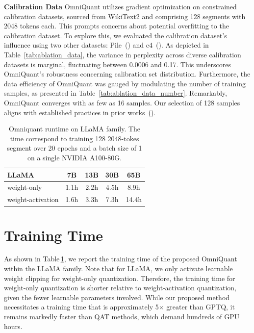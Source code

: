 \documentclass{article} %
\begin{document}
\textbf{Calibration Data}
OmniQuant utilizes gradient optimization on constrained calibration datasets, sourced from WikiText2 and comprising 128 segments with 2048 tokens each. This prompts concerns about potential overfitting to the calibration dataset. To explore this, we evaluated the calibration dataset's influence using two other datasets: Pile~(\cite{pile}) and c4~(\cite{c4}).
%
As depicted in Table~\ref{tab:ablation_data}, the variance in perplexity across diverse calibration datasets is marginal, fluctuating between 0.0006 and 0.17.  This underscores OmniQuant's robustness concerning calibration set distribution.
%
Furthermore, the data efficiency of OmniQuant was gauged by modulating the number of training samples, as presented in Table~\ref{tab:ablation_data_number}. Remarkably, OmniQuant converges with as few as 16 samples. Our selection of 128 samples aligns with established practices in prior works~(\cite{gptq,awq}).

\begin{table}[!ht]
    \centering
    \caption{Omniquant runtime on LLaMA family. The time correspond to training 128 2048-tokes segment over 20 epochs and a batch size of 1 on a single NVIDIA A100-80G.}
    \begin{tabular}{lcccc}
    \hline
    LLaMA & 7B & 13B & 30B & 65B \\
    \hline
    weight-only & 1.1h & 2.2h & 4.5h & 8.9h \\ 
    weight-activation & 1.6h & 3.3h & 7.3h & 14.4h\\
    \hline 
    \end{tabular}
    \label{tab:time}
\end{table}

\section{Training Time}\label{sec:training-time}
As shown in Table\,\ref{tab:time}, we report the training time of the proposed OmniQuant within the LLaMA family. Note that for LLaMA, we only activate learnable weight clipping for weight-only quantization. Therefore, the training time for weight-only quantization is shorter relative to weight-activation quantization, given the fewer learnable parameters involved.  While our proposed method necessitates a training time that is approximately 5$\times$ greater than GPTQ, it remains markedly faster than QAT methods, which demand hundreds of GPU hours.
\end{document}
